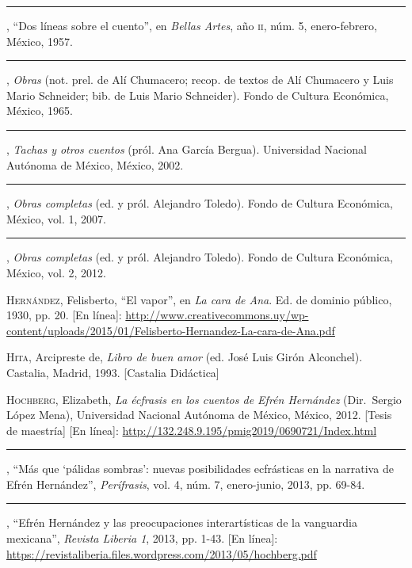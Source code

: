 \documentclass[14pt,twoside,final]{extbook} %
\begin{document}
\rule{1cm}{0.4pt}, ``Dos líneas sobre el cuento'', en \emph{Bellas Artes}, año \textsc{ii}, núm. 5, enero-febrero, México, 1957.\label{bib:hernandez1957}

\rule{1cm}{0.4pt}, \emph{Obras} (not. prel. de Alí Chumacero; recop. de textos de Alí Chumacero y Luis Mario Schneider; bib. de Luis Mario Schneider). Fondo de Cultura Económica, México, 1965.\label{bib:hernandez1965}

\rule{1cm}{0.4pt}, \emph{Tachas y otros cuentos} (pról. Ana García Bergua). Universidad Nacional Autónoma de México, México, 2002.\label{bib:hernandez2002}

\rule{1cm}{0.4pt}, \emph{Obras completas} (ed. y pról. Alejandro Toledo). Fondo de Cultura Económica, México, vol. 1, 2007.\label{bib:hernandez2007}

\rule{1cm}{0.4pt}, \emph{Obras completas} (ed. y pról. Alejandro Toledo). Fondo de Cultura Económica, México, vol. 2, 2012.\label{bib:hernandez2012}

\textsc{Hernández}, Felisberto, ``El vapor'', en \emph{La cara de Ana}. Ed. de dominio público, 1930, pp. 20. [En línea]: \href{http://www.creativecommons.uy/wp-content/uploads/2015/01/Felisberto-Hernandez-La-cara-de-Ana.pdf}{http://www.creativecommons.uy/wp-content/uploads/2015/01/Felisberto-Hernandez-La-cara-de-Ana.pdf}\label{fhernandez1930}

\textsc{Hita}, Arcipreste de, \emph{Libro de buen amor} (ed. José Luis Girón Alconchel). Castalia, Madrid, 1993. [Castalia Didáctica]\label{bib:hita1993}

\textsc{Hochberg}, Elizabeth, \emph{La écfrasis en los cuentos de Efrén Hernández} (Dir.~Sergio López Mena), Universidad Nacional Autónoma de México, México, 2012. [Tesis de maestría] [En línea]: \url{http://132.248.9.195/pmig2019/0690721/Index.html}\label{bib:hochberg2012}

\rule{1cm}{0.4pt}, ``Más que `pálidas sombras': nuevas posibilidades ecfrásticas en la narrativa de Efrén Hernández'', \emph{Perífrasis}, vol. 4, núm. 7, enero-junio, 2013, pp. 69-84.\label{bib:hochberg2013a}

\rule{1cm}{0.4pt}, ``Efrén Hernández y las preocupaciones interartísticas de la vanguardia mexicana'', \emph{Revista Liberia 1}, 2013, pp. 1-43. [En línea]: \url{https://revistaliberia.files.wordpress.com/2013/05/hochberg.pdf}\label{bib:hochberg2013b}
\end{document}
